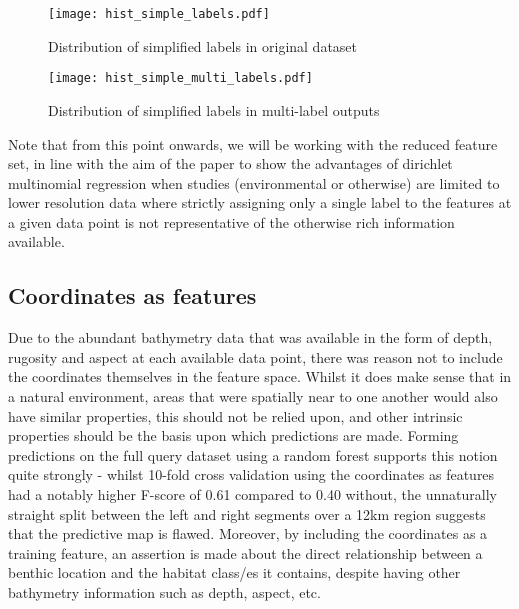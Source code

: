 \begin{figure}[H]
    \begin{minipage}{.49\linewidth}
        \texttt{[image: hist\_simple\_labels.pdf]}
        \caption{Distribution of simplified labels in original dataset}
        \label{fig:singlelabeldistr}
    \end{minipage}
    \hfill
    \begin{minipage}{.49\linewidth}
        \texttt{[image: hist\_simple\_multi\_labels.pdf]}
        \caption{Distribution of simplified labels in multi-label outputs}
        \label{fig:multilabeldistr}
    \end{minipage}
\end{figure}

Note that from this point onwards, we will be working with the reduced feature set, in line with the aim of the paper to show the advantages of dirichlet multinomial regression when studies (environmental or otherwise) are limited to lower resolution data where strictly assigning only a single label to the features at a given data point is not representative of the otherwise rich information available.

\subsection{Coordinates as features}
Due to the abundant bathymetry data that was available in the form of depth, rugosity and aspect at each available data point, there was reason not to include the coordinates themselves in the feature space. Whilst it does make sense that in a natural environment, areas that were spatially near to one another would also have similar properties, this should not be relied upon, and other intrinsic properties should be the basis upon which predictions are made. Forming predictions on the full query dataset using a random forest supports this notion quite strongly - whilst 10-fold cross validation using the coordinates as features had a notably higher F-score of 0.61 compared to 0.40 without, the unnaturally straight split between the left and right segments over a 12km region suggests that the predictive map is flawed. Moreover, by including the coordinates as a training feature, an assertion is made about the direct relationship between a benthic location and the habitat class/es it contains, despite having other bathymetry information such as depth, aspect, etc. 


